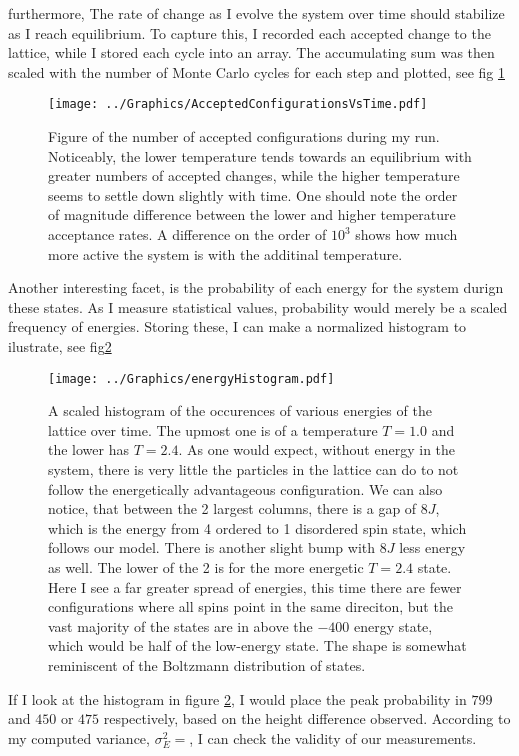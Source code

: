 \documentclass[10pt, twocolumn]{revtex4-1}
\begin{document}
furthermore, The rate of change as I evolve the system over time should stabilize as I reach equilibrium. To capture this, I recorded each accepted change
to the lattice, while I stored each cycle into an array. The accumulating sum was then scaled with the number of Monte Carlo cycles for each step and plotted,
see fig \ref{fig:Accepted}
\begin{figure}[hbtp]
    \texttt{[image: ../Graphics/AcceptedConfigurationsVsTime.pdf]}
    \caption{Figure of the number of accepted configurations during my run. Noticeably, the lower temperature tends towards an equilibrium with greater
    numbers of accepted changes, while the higher temperature seems to settle down slightly with time. One should note the order of magnitude difference
    between the lower and higher temperature acceptance rates. A difference on the order of $10^3$ shows how much more active the system is with the
    additinal temperature.}
\label{fig:Accepted}
\end{figure}


Another interesting facet, is the probability of each energy for the system durign these states. As I measure statistical values, probability would merely
be a scaled frequency of energies. Storing these, I can make a normalized histogram to ilustrate, see fig\ref{fig:PrEhist}
\begin{figure}[hbtp]
    \texttt{[image: ../Graphics/energyHistogram.pdf]}
    \caption{A scaled histogram of the occurences of various energies of the lattice over time. The upmost one is of a temperature $T=1.0$ and the lower
    has $T=2.4$. As one would expect, without energy in the system, there is very little the particles in the lattice can do to not follow the energetically
    advantageous configuration. We can also notice, that between the 2 largest columns, there is a gap of $8J$, which is the energy from 4 ordered to 1
    disordered spin state, which follows our model. There is another slight bump with $8J$ less energy as well. The lower of the 2 is for the more energetic
    $T=2.4$ state. Here I see a far greater spread of energies, this time there are fewer configurations where all spins point in the same direciton, but the
    vast majority of the states are in above the $-400$ energy state, which would be half of the low-energy state. The shape is somewhat reminiscent of the
    Boltzmann distribution of states.}
\label{fig:PrEhist}
\end{figure}
If I look at the histogram in figure \ref{fig:PrEhist}, I would place the peak probability in $799$ and $450$ or $475$ respectively, based on the height
difference observed. According to my computed variance, $\sigma_E^2=$, I can check the validity of our measurements.
\end{document}
